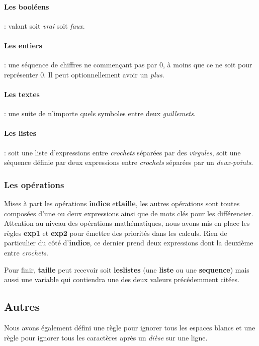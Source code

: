 \paragraph{Les booléens}: valant soit \textit{vrai} soit \textit{faux}.

\paragraph{Les entiers}: une séquence de chiffres ne commençant pas par 0, à moins que ce ne soit pour représenter 0. Il peut optionnellement avoir un \textit{plus}.

\paragraph{Les textes}: une suite de n'importe quels symboles entre deux \textit{guillemets}.

\paragraph{Les listes}: soit une liste d'expressions entre \textit{crochets} séparées par des \textit{virgules}, soit une séquence définie par deux expressions entre \textit{crochets} séparées par un \textit{deux-points}.

\subsubsection{Les opérations}
Mises à part les opérations \textbf{indice} et\textbf{taille}, les autres opérations sont toutes composées d'une ou deux expressions ainsi que de mots clés pour les différencier. 
Attention au niveau des opérations mathématiques, nous avons mis en place les règles \textbf{exp1} et \textbf{exp2} pour émettre des priorités dans les calculs.
Rien de particulier du côté d'\textbf{indice}, ce dernier prend deux expressions dont la deuxième entre \textit{crochets}.

Pour finir, \textbf{taille} peut recevoir soit \textbf{leslistes} (une \textbf{liste} ou une \textbf{sequence})
mais aussi une variable qui contiendra une des deux valeurs précédemment citées.

\subsection{Autres}
Nous avons également défini une règle pour ignorer tous les espaces blancs et une règle pour ignorer tous les caractères après un \textit{dièse} sur une ligne.

